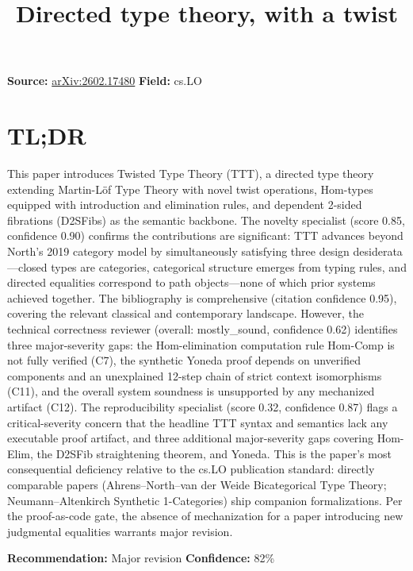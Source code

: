 \documentclass[11pt]{article}
\title{Directed type theory, with a twist}
\date{}
\begin{document}
\maketitle

\noindent\textbf{Source:} \href{https://arxiv.org/abs/2602.17480}{arXiv:2602.17480} \quad \textbf{Field:} cs.LO\\

\section*{TL;DR}
This paper introduces Twisted Type Theory (TTT), a directed type theory extending Martin-Löf Type Theory with novel twist operations, Hom-types equipped with introduction and elimination rules, and dependent 2-sided fibrations (D2SFibs) as the semantic backbone. The novelty specialist (score 0.85, confidence 0.90) confirms the contributions are significant: TTT advances beyond North's 2019 category model by simultaneously satisfying three design desiderata—closed types are categories, categorical structure emerges from typing rules, and directed equalities correspond to path objects—none of which prior systems achieved together. The bibliography is comprehensive (citation confidence 0.95), covering the relevant classical and contemporary landscape. However, the technical correctness reviewer (overall: mostly\_sound, confidence 0.62) identifies three major-severity gaps: the Hom-elimination computation rule Hom-Comp is not fully verified (C7), the synthetic Yoneda proof depends on unverified components and an unexplained 12-step chain of strict context isomorphisms (C11), and the overall system soundness is unsupported by any mechanized artifact (C12). The reproducibility specialist (score 0.32, confidence 0.87) flags a critical-severity concern that the headline TTT syntax and semantics lack any executable proof artifact, and three additional major-severity gaps covering Hom-Elim, the D2SFib straightening theorem, and Yoneda. This is the paper's most consequential deficiency relative to the cs.LO publication standard: directly comparable papers (Ahrens–North–van der Weide Bicategorical Type Theory; Neumann–Altenkirch Synthetic 1-Categories) ship companion formalizations. Per the proof-as-code gate, the absence of mechanization for a paper introducing new judgmental equalities warrants major revision.

\textbf{Recommendation:} Major revision \quad \textbf{Confidence:} 82\%\\
\end{document}
